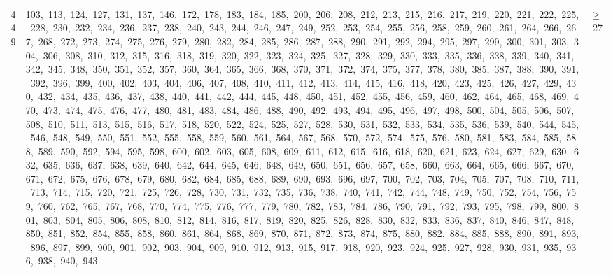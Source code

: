 \begin{longtable}{c|p{}|r}
449 & 103,\ 113,\ 124,\ 127,\ 131,\ 137,\ 146,\ 172,\ 178,\ 183,\ 184,\ 185,\ 200,\ 206,\ 208,\ 212,\ 213,\ 215,\ 216,\ 217,\ 219,\ 220,\ 221,\ 222,\ 225,\ 228,\ 230,\ 232,\ 234,\ 236,\ 237,\ 238,\ 240,\ 243,\ 244,\ 246,\ 247,\ 249,\ 252,\ 253,\ 254,\ 255,\ 256,\ 258,\ 259,\ 260,\ 261,\ 264,\ 266,\ 267,\ 268,\ 272,\ 273,\ 274,\ 275,\ 276,\ 279,\ 280,\ 282,\ 284,\ 285,\ 286,\ 287,\ 288,\ 290,\ 291,\ 292,\ 294,\ 295,\ 297,\ 299,\ 300,\ 301,\ 303,\ 304,\ 306,\ 308,\ 310,\ 312,\ 315,\ 316,\ 318,\ 319,\ 320,\ 322,\ 323,\ 324,\ 325,\ 327,\ 328,\ 329,\ 330,\ 333,\ 335,\ 336,\ 338,\ 339,\ 340,\ 341,\ 342,\ 345,\ 348,\ 350,\ 351,\ 352,\ 357,\ 360,\ 364,\ 365,\ 366,\ 368,\ 370,\ 371,\ 372,\ 374,\ 375,\ 377,\ 378,\ 380,\ 385,\ 387,\ 388,\ 390,\ 391,\ 392,\ 396,\ 399,\ 400,\ 402,\ 403,\ 404,\ 406,\ 407,\ 408,\ 410,\ 411,\ 412,\ 413,\ 414,\ 415,\ 416,\ 418,\ 420,\ 423,\ 425,\ 426,\ 427,\ 429,\ 430,\ 432,\ 434,\ 435,\ 436,\ 437,\ 438,\ 440,\ 441,\ 442,\ 444,\ 445,\ 448,\ 450,\ 451,\ 452,\ 455,\ 456,\ 459,\ 460,\ 462,\ 464,\ 465,\ 468,\ 469,\ 470,\ 473,\ 474,\ 475,\ 476,\ 477,\ 480,\ 481,\ 483,\ 484,\ 486,\ 488,\ 490,\ 492,\ 493,\ 494,\ 495,\ 496,\ 497,\ 498,\ 500,\ 504,\ 505,\ 506,\ 507,\ 508,\ 510,\ 511,\ 513,\ 515,\ 516,\ 517,\ 518,\ 520,\ 522,\ 524,\ 525,\ 527,\ 528,\ 530,\ 531,\ 532,\ 533,\ 534,\ 535,\ 536,\ 539,\ 540,\ 544,\ 545,\ 546,\ 548,\ 549,\ 550,\ 551,\ 552,\ 555,\ 558,\ 559,\ 560,\ 561,\ 564,\ 567,\ 568,\ 570,\ 572,\ 574,\ 575,\ 576,\ 580,\ 581,\ 583,\ 584,\ 585,\ 588,\ 589,\ 590,\ 592,\ 594,\ 595,\ 598,\ 600,\ 602,\ 603,\ 605,\ 608,\ 609,\ 611,\ 612,\ 615,\ 616,\ 618,\ 620,\ 621,\ 623,\ 624,\ 627,\ 629,\ 630,\ 632,\ 635,\ 636,\ 637,\ 638,\ 639,\ 640,\ 642,\ 644,\ 645,\ 646,\ 648,\ 649,\ 650,\ 651,\ 656,\ 657,\ 658,\ 660,\ 663,\ 664,\ 665,\ 666,\ 667,\ 670,\ 671,\ 672,\ 675,\ 676,\ 678,\ 679,\ 680,\ 682,\ 684,\ 685,\ 688,\ 689,\ 690,\ 693,\ 696,\ 697,\ 700,\ 702,\ 703,\ 704,\ 705,\ 707,\ 708,\ 710,\ 711,\ 713,\ 714,\ 715,\ 720,\ 721,\ 725,\ 726,\ 728,\ 730,\ 731,\ 732,\ 735,\ 736,\ 738,\ 740,\ 741,\ 742,\ 744,\ 748,\ 749,\ 750,\ 752,\ 754,\ 756,\ 759,\ 760,\ 762,\ 765,\ 767,\ 768,\ 770,\ 774,\ 775,\ 776,\ 777,\ 779,\ 780,\ 782,\ 783,\ 784,\ 786,\ 790,\ 791,\ 792,\ 793,\ 795,\ 798,\ 799,\ 800,\ 801,\ 803,\ 804,\ 805,\ 806,\ 808,\ 810,\ 812,\ 814,\ 816,\ 817,\ 819,\ 820,\ 825,\ 826,\ 828,\ 830,\ 832,\ 833,\ 836,\ 837,\ 840,\ 846,\ 847,\ 848,\ 850,\ 851,\ 852,\ 854,\ 855,\ 858,\ 860,\ 861,\ 864,\ 868,\ 869,\ 870,\ 871,\ 872,\ 873,\ 874,\ 875,\ 880,\ 882,\ 884,\ 885,\ 888,\ 890,\ 891,\ 893,\ 896,\ 897,\ 899,\ 900,\ 901,\ 902,\ 903,\ 904,\ 909,\ 910,\ 912,\ 913,\ 915,\ 917,\ 918,\ 920,\ 923,\ 924,\ 925,\ 927,\ 928,\ 930,\ 931,\ 935,\ 936,\ 938,\ 940,\ 943 & $\ge$ 27 \\

\end{longtable}
